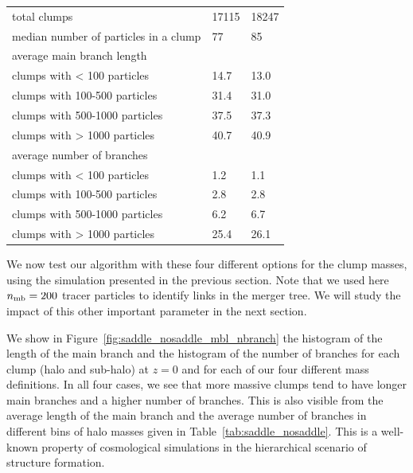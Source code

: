 \documentclass[a4paper,twocolumn,fleqn,usenatbib]{mnras}
\providecommand{\DIFaddendFL}{} %
\DeclareRobustCommand{\DIFaddendFL}{\DIFOaddendFL \let\includegraphics\DIFOincludegraphics} %
\begin{document}
\begin{table}
{\begin{tabular}[c]{l | p{2.8cm} | p{2.8cm} |}
			\hline
			total clumps	 													&	 17115	& 	18247 	\\			
			median number of particles in a clump 	&	 77			& 	85 		\\			
			\hline
			average main branch length & & \\
			clumps with < 100 particles			&	14.7	& 	13.0 	\\			
			clumps with 100-500 particles		&	31.4	& 	31.0 	\\			
			clumps with 500-1000 particles	&	37.5	& 	37.3 	\\			
			clumps with > 1000 particles		&	40.7	& 	40.9 	\\			
			\hline
			average number of branches & & \\
			clumps with < 100 particles			&	1.2		& 	1.1 	\\			
			clumps with 100-500 particles		&	2.8		& 	2.8 	\\			
			clumps with 500-1000 particles	&	6.2		& 	6.7 	\\			
			clumps with > 1000 particles		&	25.4	& 	26.1 	\\				
			\hline	
		\end{tabular}
	}
\DIFaddendFL \end{table}

We now test our algorithm with these four different options for the clump
masses, using the simulation presented in the previous section. Note
that we used here $n_{\rm mb}=200$ tracer particles to identify links
in the merger tree. We will study the impact of this other important
parameter in the next section.

We show in Figure~\ref{fig:saddle_nosaddle_mbl_nbranch} the histogram
of the length of the main branch and the histogram of the number of
branches for each clump (halo and sub-halo) at $z=0$ and for each of
our four different mass definitions. In all four cases, we see that more
massive clumps tend to have longer main branches and a higher number
of branches.  This is also visible from the average length of the main
branch and the average number of branches in different bins of halo
masses given in Table~\ref{tab:saddle_nosaddle}. This is a well-known
property of cosmological simulations in the hierarchical scenario of
structure formation.
\end{document}
